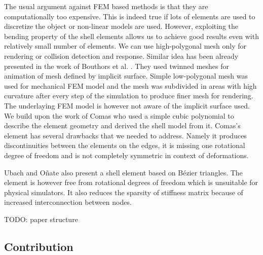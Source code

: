 \documentclass{egpubl}
\begin{document}
The usual argument against FEM based methods is that they are
computationally too expensive. This is indeed true if lots of elements are
used to discretize the object or non-linear models are used. However,
exploiting the bending property of the shell elements allows us to achieve
good results even with relatively small number of elements. We can use
high-polygonal mesh only for rendering or collision detection and response.
Similar idea has been already presented in the work of Bouthors et al.
\cite{Bouthors2007}. They used twinned meshes for animation of mesh defined
by implicit surface. Simple low-polygonal mesh was used for mechanical FEM
model and the mesh was subdivided in areas with high curvature after every
step of the simulation to produce finer mesh for rendering. The underlaying
FEM model is however not aware of the implicit surface used. We build upon
the work of Comas \cite{Comas2010c} who used a simple cubic polynomial to
describe the element geometry and derived the shell model from it. Comas's
element has several drawbacks that we needed to address. Namely it produces
discontinuities between the elements on the edges, it is missing one
rotational degree of freedom and is not completely symmetric in context of
deformations.

Ubach and Oñate \cite{Ubach2010} also present a shell element based on
Bézier triangles. The element is however free from rotational degrees of
freedom which is unsuitable for physical simulators. It also reduces the
sparsity of stiffness matrix because of increased interconnection between
nodes.

%
TODO: paper structure

\subsection{Contribution}
\end{document}
